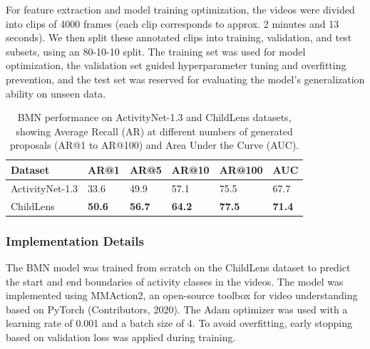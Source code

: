 \documentclass[
  man,floatsintext]{apa6}
\begin{document}
For feature extraction and model training optimization, the videos were divided into clips of 4000 frames (each clip corresponds to approx. 2 minutes and 13 seconds). We then split these annotated clips into training, validation, and test subsets, using an 80-10-10 split. The training set was used for model optimization, the validation set guided hyperparameter tuning and overfitting prevention, and the test set was reserved for evaluating the model's generalization ability on unseen data.

\begin{table}[tbp]

\begin{center}
\begin{threeparttable}

\caption{\label{tab:bmn-results}BMN performance on ActivityNet-1.3 and ChildLens datasets, showing Average Recall (AR) at different numbers of generated proposals (AR@1 to AR@100) and Area Under the Curve (AUC).}

\begin{tabular}{llllll}
\toprule
Dataset & \multicolumn{1}{c}{AR@1} & \multicolumn{1}{c}{AR@5} & \multicolumn{1}{c}{AR@10} & \multicolumn{1}{c}{AR@100} & \multicolumn{1}{c}{AUC}\\
\midrule
ActivityNet-1.3 & 33.6 & 49.9 & 57.1 & 75.5 & 67.7\\
ChildLens & \textbf{50.6} & \textbf{56.7} & \textbf{64.2} & \textbf{77.5} & \textbf{71.4}\\
\bottomrule
\end{tabular}

\end{threeparttable}
\end{center}

\end{table}

\subsubsection{Implementation Details}\label{implementation-details}

The BMN model was trained from scratch on the ChildLens dataset to predict the start and end boundaries of activity classes in the videos. The model was implemented using MMAction2, an open-source toolbox for video understanding based on PyTorch (Contributors, 2020). The Adam optimizer was used with a learning rate of 0.001 and a batch size of 4. To avoid overfitting, early stopping based on validation loss was applied during training.
\end{document}
